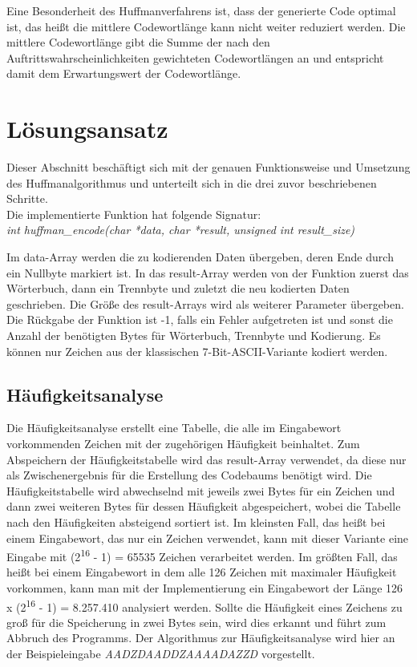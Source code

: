 \documentclass[course=erap]{aspdoc}
\begin{document}
Eine Besonderheit des Huffmanverfahrens ist, dass der generierte Code optimal ist, das heißt die mittlere Codewortlänge kann nicht weiter reduziert werden. Die mittlere Codewortlänge gibt die Summe der nach den Auftrittswahrscheinlichkeiten gewichteten Codewortlängen an und entspricht damit dem Erwartungswert der Codewortlänge.\cite{codierungstheorieVT}\\

\section{Lösungsansatz}

Dieser Abschnitt beschäftigt sich mit der genauen Funktionsweise und Umsetzung des Huffmanalgorithmus und unterteilt sich in die drei zuvor beschriebenen Schritte.\\Die implementierte Funktion hat folgende Signatur:\\\textit{int huffman\_encode(char *data, char *result, unsigned int result\_size)}

Im data-Array werden die zu kodierenden Daten übergeben, deren Ende durch ein Nullbyte markiert ist. In das result-Array werden von der Funktion zuerst das Wörterbuch, dann ein Trennbyte und zuletzt die neu kodierten Daten geschrieben. Die Größe des result-Arrays wird als weiterer Parameter übergeben. Die Rückgabe der Funktion ist -1, falls ein Fehler aufgetreten ist und sonst die Anzahl der benötigten Bytes für Wörterbuch, Trennbyte und Kodierung. Es können nur Zeichen aus der klassischen 7-Bit-ASCII-Variante kodiert werden.\\

\subsection{Häufigkeitsanalyse}

Die Häufigkeitsanalyse erstellt eine Tabelle, die alle im Eingabewort vorkommenden Zeichen mit der zugehörigen Häufigkeit beinhaltet. Zum Abspeichern der Häufigkeitstabelle wird das result-Array verwendet, da diese nur als Zwischenergebnis für die Erstellung des Codebaums benötigt wird. Die Häufigkeitstabelle wird abwechselnd mit jeweils zwei Bytes für ein Zeichen und dann zwei weiteren Bytes für dessen Häufigkeit abgespeichert, wobei die Tabelle nach den Häufigkeiten absteigend sortiert ist. Im kleinsten Fall, das heißt bei einem Eingabewort, das nur ein Zeichen verwendet, kann mit dieser Variante eine Eingabe mit (2\textsuperscript{16} - 1) = 65535 Zeichen verarbeitet werden. Im größten Fall, das heißt bei einem Eingabewort in dem alle 126 Zeichen mit maximaler Häufigkeit vorkommen, kann man mit der Implementierung ein Eingabewort der Länge 126 x (2\textsuperscript{16} - 1) = 8.257.410 analysiert werden. Sollte die Häufigkeit eines Zeichens zu groß für die Speicherung in zwei Bytes sein, wird dies erkannt und führt zum Abbruch des Programms. Der Algorithmus zur Häufigkeitsanalyse wird hier an der Beispieleingabe \textit{AADZDAADDZAAAADAZZD} vorgestellt.
\end{document}
